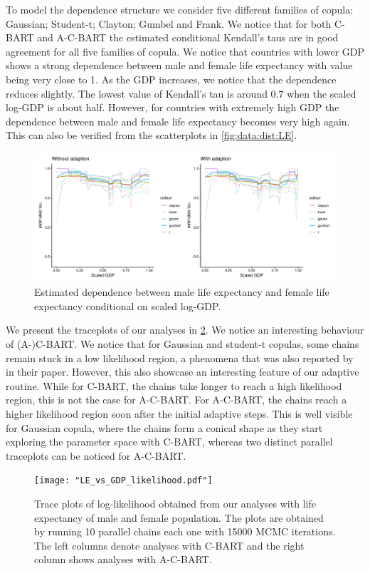 \documentclass{amsart}
\begin{document}
To model the dependence structure we consider five different families of copula: Gaussian; Student-t; Clayton; Gumbel and Frank. We notice that for both C-BART and A-C-BART the estimated conditional Kendall's taus are in good agreement for all five families of copula. We notice that countries with lower GDP shows a strong dependence between male and female life expectancy with value being very close to 1. As the GDP increases, we notice that the dependence reduces slightly. The lowest value of Kendall's tau is around 0.7 when the scaled log-GDP is about half. However, for countries with extremely high GDP the dependence between male and female life expectancy becomes very high again. This can also be verified from the scatterplots in \cref{fig:data:dist:LE}. 
 
\begin{figure}
	\centering
	\includegraphics[width = 0.95\linewidth]{"LE_vs_GDP_taus.pdf"}
	\caption{Estimated dependence between male life expectancy and female life expectancy conditional on scaled log-GDP.}
	\label{fig:taus:LE}
\end{figure}

We present the traceplots of our analyses in \cref{fig:trace:like:real:LE}. We notice an interesting behaviour of (A-)C-BART. We notice that for Gaussian and student-t copulas, some chains remain stuck in a low likelihood region, a phenomena that was also reported by \citet{chipman98BCART} in their paper. However, this also showcase an interesting feature of our adaptive routine. While for C-BART, the chains take longer to reach a high likelihood 
region, this is not the case for A-C-BART. For A-C-BART, the chains reach a higher likelihood region soon after the initial adaptive steps. This is well visible for Gaussian copula, where the chains form a conical shape as they start exploring the parameter space with C-BART, whereas two distinct parallel traceplots can be noticed for A-C-BART.

\begin{figure}
	\centering
	\texttt{[image: "LE\_vs\_GDP\_likelihood.pdf"]}
	\caption{Trace plots of log-likelihood obtained from our analyses with life expectancy of male and female population. The plots are obtained by running 10 parallel chains each one with 15000 MCMC iterations. The left columns denote analyses with C-BART and the right column shows analyses with A-C-BART.}
	\label{fig:trace:like:real:LE}
\end{figure}
\end{document}
